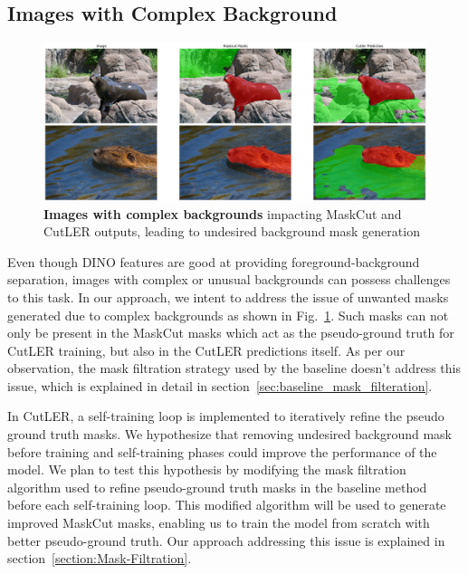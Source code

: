 \subsection{Images with Complex Background}
\begin{figure}
	\centering
	\includegraphics[width=1\textwidth]{Images/main/cutler-prob-noisy-bg.png}
	\caption[\textbf{Cutler's Performance on Images with Complex Background}]{\textbf{Images with complex backgrounds} impacting MaskCut and CutLER outputs, leading to undesired background mask generation}
	\label{fig:cutler_noisy_bg_eg}
\end{figure}

Even though DINO features are good at providing foreground-background separation, images with complex or unusual backgrounds can possess challenges to this task. In our approach, we intent to address the issue of unwanted masks generated due to complex backgrounds as shown in Fig.~\ref{fig:cutler_noisy_bg_eg}. Such masks can not only be present in the MaskCut masks which act as the pseudo-ground truth for CutLER training, but also in the CutLER predictions itself. As per our observation, the mask filtration strategy used by the baseline doesn't address this issue, which is explained in detail in section~\ref{sec:baseline_mask_filteration}.

In CutLER, a self-training loop is implemented to iteratively refine the pseudo ground truth masks. We hypothesize that removing undesired background mask before training and self-training phases could improve the performance of the model. We plan to test this hypothesis by modifying the mask filtration algorithm used to refine pseudo-ground truth masks in the baseline method before each self-training loop. This modified algorithm will be used to generate improved MaskCut masks, enabling us to train the model from scratch with better pseudo-ground truth. Our approach addressing this issue is explained in section~\ref{section:Mask-Filtration}.

